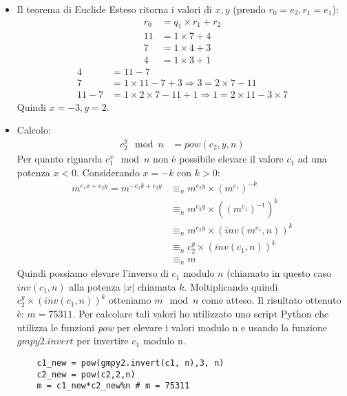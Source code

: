 \documentclass{article}
\begin{document}
\begin{itemize}
    \item Il teorema di Euclide Esteso ritorna i valori di $x,y$ (prendo $r_0 = e_2, r_1 = e_1$):
        \begin{equation}
        \begin{split}
            r_0 &= q_1 \times r_1 + r_2\\
            11 &= 1 \times 7 + 4\\
            7 &= 1 \times 4 + 3\\
            4 &= 1 \times 3 + 1
        \end{split}
        \end{equation} \nonumber
        \begin{equation}
          \begin{split}
            4 &= 11 - 7\\
            7 &= 1 \times 11 - 7 + 3 \Rightarrow 3 = 2 \times 7 - 11\\
            11 - 7 &= 1 \times 2 \times 7 - 11 + 1 \Rightarrow 1 = 2 \times 11 - 3 \times 7
          \end{split}
        \end{equation} \nonumber
    Quindi $x = -3, y = 2$.
    \item Calcolo:
    \begin{equation}
        \begin{split}
            c_2^y\mod{n} &= pow(c_2,y,n)
        \end{split}
        \end{equation} \nonumber
    Per quanto riguarda $c_1^x\mod{n}$ non è possibile elevare il valore $c_1$ ad una potenza $x < 0$. Considerando $x = -k$ con $k > 0$:
    \begin{equation}
        \begin{split}
            m^{e_1 x+e_2 y} = m^{-e_1 k+e_2 y} &\equiv_n  m^{e_2 y} \times (m^{e_1})^{-k}\\
                                  &\equiv_n  m^{e_2y} \times ((m^{e_1})^{-1})^k\\
                                  &\equiv_n  m^{e_2y} \times (inv(m^{e_1},n))^k\\
                                  &\equiv_n  c_2^y \times (inv(c_1,n))^k\\
                                  &\equiv_n m
        \end{split}
    \end{equation}\nonumber
    Quindi possiamo elevare l'inverso di $c_1$ modulo $n$ (chiamato in questo caso $inv(c_1,n)$ alla potenza $|x|$ chiamata $k$. Moltiplicando quindi $c_2^y \times (inv(c_1,n))^k$ otteniamo $m \mod{n}$ come atteso. Il risultato ottenuto è: $m = 75311$.
    Per calcolare tali valori ho utilizzato uno script Python che utilizza le funzioni \textit{pow} per elevare i valori modulo n e usando la funzione $gmpy2.invert$ per invertire $c_1$ modulo n.
    \begin{lstlisting}
    c1_new = pow(gmpy2.invert(c1, n),3, n)
    c2_new = pow(c2,2,n)
    m = c1_new*c2_new%n # m = 75311
    \end{lstlisting}
\end{itemize}
\end{document}

